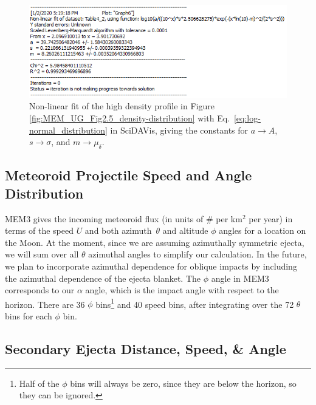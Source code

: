 \documentclass{hitec}
\begin{document}
\begin{figure}[h!]
	\centering
	\includegraphics[scale=0.85]{Fit-to-MEM_high_dens.PNG}
	\caption{Non-linear fit of the high density profile in Figure \ref{fig:MEM_UG_Fig2.5_density-distribution} with Eq.\ \ref{eq:log-normal_distribution} in \textsf{SciDAVis}, giving the constants for $a\rightarrow A$, $s\rightarrow \sigma$, and $m\rightarrow \mu_\delta$.}\label{fig:Fit-to-MEM_high_dens}
\end{figure}

\subsection{Meteoroid Projectile Speed and Angle Distribution}

MEM3 gives the incoming meteoroid flux (in units of \# per km$^2$ per year) in terms of the speed $U$ and both azimuth~$\theta$ and altitude $\phi$ angles for a location on the Moon. At the moment, since we are assuming azimuthally symmetric ejecta, we will sum over all $\theta$ azimuthal angles to simplify our calculation. In the future, we plan to incorporate azimuthal dependence for oblique impacts by including the azimuthal dependence of the ejecta blanket. The $\phi$ angle in MEM3 corresponds to our $\alpha$ angle, which is the impact angle with respect to the horizon. There are 36 $\phi$ bins\footnote{Half of the $\phi$ bins will always be zero, since they are below the horizon, so they can be ignored.} and 40 speed bins, after integrating over the 72 $\theta$ bins for each $\phi$ bin.


\subsection{Secondary Ejecta Distance, Speed, \& Angle}
\end{document}
